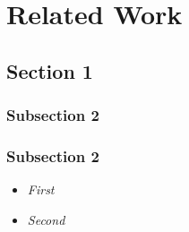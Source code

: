\chapter{Related Work}
\label{ch:relatedwork}
\glsresetall

\lipsum[1]

\section{Section 1}

\lipsum[1-2]

\subsection{Subsection 2}
 
\lipsum[1-2]

\subsection{Subsection 2}

\lipsum[1-2]


\begin{itemize}
	\item \emph{First} \lipsum[1]
	
	\item \emph{Second} \lipsum[2]
\end{itemize} 




